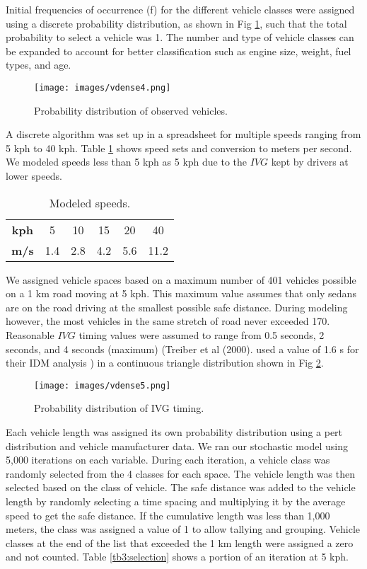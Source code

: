 Initial frequencies of occurrence (f) for the different vehicle classes were assigned using a discrete probability distribution, as shown in Fig \ref{fig4:vehobs}, such that the total probability to select a vehicle was 1.  The number and type of vehicle classes can be expanded to account for better classification such as engine size, weight, fuel types, and age.
 
%
\begin{figure}
\texttt{[image: images/vdense4.png]} 
\caption{Probability distribution of observed vehicles.}
\label{fig4:vehobs}
\end{figure}
%

A discrete algorithm was set up in a spreadsheet for multiple speeds ranging from 5 kph to 40 kph.  Table \ref{tb2:modelspeeds} shows speed sets and conversion to meters per second.  We modeled speeds less than 5 kph as 5 kph due to the $IVG$ kept by drivers at lower speeds.

\begin{table}[]
\centering
\caption{Modeled speeds.}
\label{tb2:modelspeeds}
\begin{tabular}{cccccc}
\textbf{kph} & 5   & 10  & 15  & 20  & 40   \\
\textbf{m/s} & 1.4 & 2.8 & 4.2 & 5.6 & 11.2
\end{tabular}
\end{table}

We assigned vehicle spaces based on a maximum number of 401 vehicles possible on a 1 km road moving at 5 kph.  This maximum value assumes that only sedans are on the road driving at the smallest possible safe distance.  During modeling however, the most vehicles in the same stretch of road never exceeded 170.  Reasonable $IVG$ timing values were assumed to range from 0.5 seconds, 2 seconds, and 4 seconds (maximum) (Treiber et al (2000). used a value of 1.6 s for their IDM analysis \citep{Treiber2000}) in a continuous triangle distribution shown in Fig \ref{fig5:IVGobs}.
 
%
\begin{figure}
\texttt{[image: images/vdense5.png]} 
\caption{Probability distribution of IVG timing.}
\label{fig5:IVGobs}
\end{figure}
%

Each vehicle length was assigned its own probability distribution using a pert distribution and vehicle manufacturer data.  We ran our stochastic model using 5,000 iterations on each variable. 
During each iteration, a vehicle class was randomly selected from the 4 classes for each space.  The vehicle length was then selected based on the class of vehicle.  The safe distance was added to the vehicle length by randomly selecting a time spacing and multiplying it by the average speed to get the safe distance.  If the cumulative length was less than 1,000 meters, the class was assigned a value of 1 to allow tallying and grouping.  Vehicle classes at the end of the list that exceeded the 1 km length were assigned a zero and not counted.  Table \ref{tb3:selection} shows a portion of an iteration at 5 kph. 

